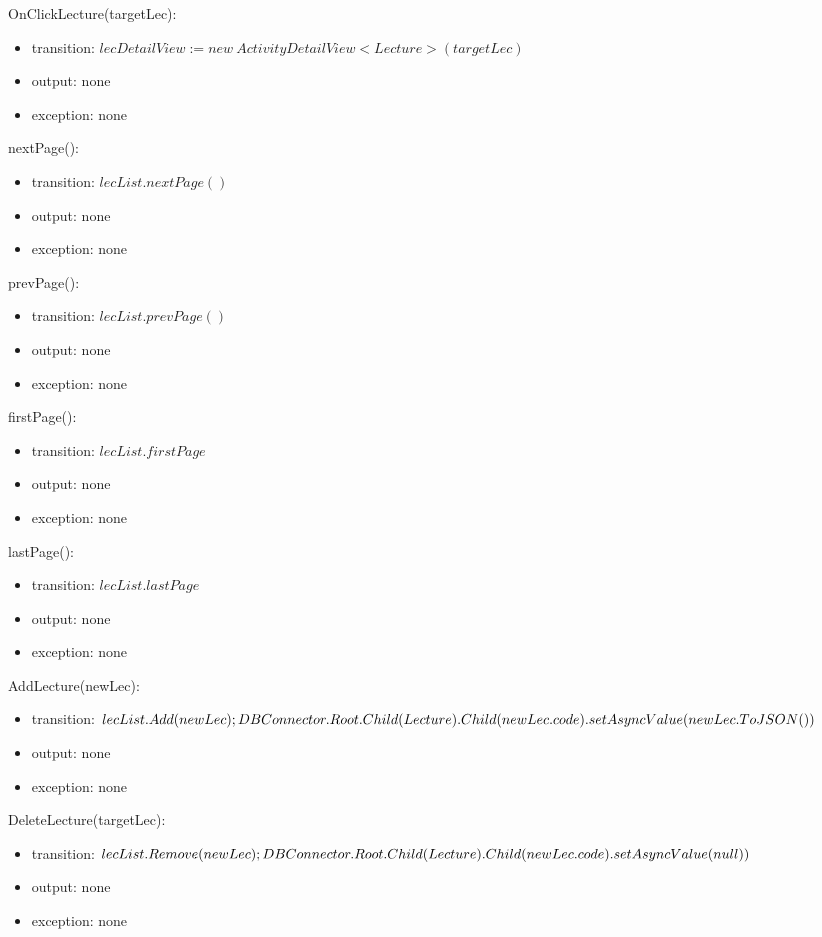 \documentclass[12pt, titlepage]{article}
\begin{document}
\noindent OnClickLecture(targetLec):
\begin{itemize}
\item transition: $lecDetailView := new\ ActivityDetailView<Lecture>(targetLec)$
\item output: none
\item exception: none
\end{itemize}

\noindent nextPage():
\begin{itemize}
\item transition: $lecList.nextPage()$
\item output: none
\item exception: none
\end{itemize}

\noindent prevPage():
\begin{itemize}
\item transition: $lecList.prevPage()$
\item output: none
\item exception: none
\end{itemize}

\noindent firstPage():
\begin{itemize}
\item transition: $lecList.firstPage$
\item output: none
\item exception: none
\end{itemize}

\noindent lastPage():
\begin{itemize}
\item transition: $lecList.lastPage$
\item output: none
\item exception: none
\end{itemize}

\noindent AddLecture(newLec):
\begin{itemize}
\item transition: $lecList.Add(newLec);\\DBConnector.Root.Child(Lecture).Child(newLec.code).setAsyncValue(newLec.ToJSON())$
\item output: none
\item exception: none
\end{itemize}

\noindent DeleteLecture(targetLec):
\begin{itemize}
\item transition: $lecList.Remove(newLec);\\DBConnector.Root.Child(Lecture).Child(newLec.code).setAsyncValue(null))$
\item output: none
\item exception: none
\end{itemize}
\end{document}

